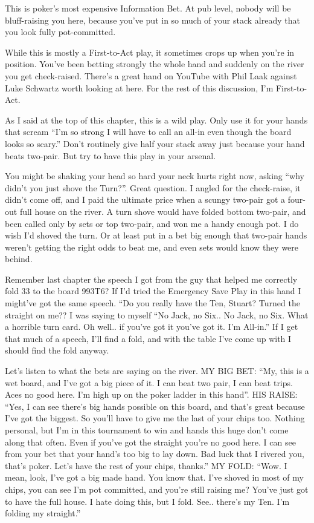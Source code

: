 This is poker's most expensive Information Bet. At pub level, nobody
will be bluff-raising you here, because you've put in so much of your
stack already that you look fully pot-committed.

While this is mostly a First-to-Act play, it sometimes crops up when
you're in position. You've been betting strongly the whole hand and
suddenly on the river you get check-raised. There's a great hand on
YouTube with Phil Laak against Luke Schwartz worth looking at here.
For the rest of this discussion, I'm First-to-Act.

As I said at the top of this chapter, this is a wild play. Only use it
for your hands that scream ``I'm so strong I will have to call an
all-in even though the board looks so scary.'' Don't routinely give
half your stack away just because your hand beats two-pair. But try to
have this play in your arsenal.

You might be shaking your head so hard your neck hurts right now,
asking ``why didn't you just shove the Turn?''. Great question. I
angled for the check-raise, it didn't come off, and I paid the
ultimate price when a scungy two-pair got a four-out full house on the
river. A turn shove would have folded bottom two-pair, and been called
only by sets or top two-pair, and won me a handy enough pot. I do wish
I'd shoved the turn. Or at least put in a bet big enough that two-pair
hands weren't getting the right odds to beat me, and even sets would
know they were behind.

Remember last chapter the speech I got from the guy that helped me
correctly fold 33 to the board 993T6? If I'd tried the Emergency Save
Play in this hand I might've got the same speech. ``Do you really have
the Ten, Stuart? Turned the straight on me?? I was saying to myself
``No Jack, no Six.. No Jack, no Six. What a horrible turn card. Oh
well.. if you've got it you've got it. I'm All-in.'' If I get that
much of a speech, I'll find a fold, and with the table I've come up
with I should find the fold anyway.

Let's listen to what the bets are saying on the river.
MY BIG BET: ``My, this is a wet board, and I've got a big piece of
it. I can beat two pair, I can beat trips. Aces no good here. I'm high
up on the poker ladder in this hand''.
HIS RAISE: ``Yes, I can see there's big hands possible on this board,
and that's great because I've got the biggest. So you'll have to give
me the last of your chips too. Nothing personal, but I'm in this
tournament to win and hands this huge don't come along that
often. Even if you've got the straight you're no good here. I can see
from your bet that your hand's too big to lay down. Bad luck that I
rivered you, that's poker. Let's have the rest of your chips,
thanks.''
MY FOLD: ``Wow. I mean, look, I've got a big made hand. You know
that. I've shoved in most of my chips, you can see I'm pot committed,
and you're still raising me? You've just got to have the full house. I
hate doing this, but I fold. See.. there's my Ten. I'm folding my
straight.''

